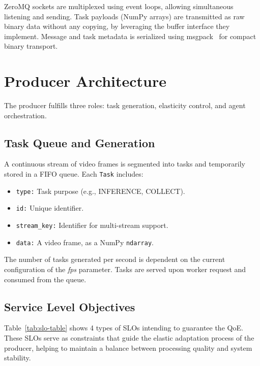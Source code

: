 ZeroMQ sockets are multiplexed using event loops, allowing simultaneous listening and sending. Task payloads (NumPy arrays) are transmitted as raw binary data without any copying, by leveraging the buffer interface they implement. Message and task metadata is serialized using msgpack~\cite{noauthor_msgpackmsgpack-python_nodate} for compact binary transport.


\section{Producer Architecture}
The producer fulfills three roles: task generation, elasticity control, and agent orchestration.

\subsection{Task Queue and Generation}
A continuous stream of video frames is segmented into tasks and temporarily stored in a FIFO queue. Each \texttt{Task} includes:
\begin{itemize}
    \item \texttt{type:} Task purpose (e.g., INFERENCE, COLLECT).
    \item \texttt{id:} Unique identifier.
    \item \texttt{stream\_key:} Identifier for multi-stream support.
    \item \texttt{data:} A video frame, as a NumPy \texttt{ndarray}.
\end{itemize}

The number of tasks generated per second is dependent on the current configuration of the \textit{fps} parameter. Tasks are served upon worker request and consumed from the queue.

\subsection{Service Level Objectives}

Table~\ref{tab:slo-table} shows 4 types of SLOs intending to guarantee the QoE. These SLOs serve as constraints that guide the elastic adaptation process of the producer, helping to maintain a balance between processing quality and system stability.

